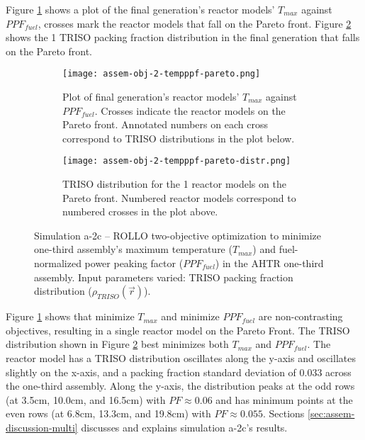 Figure \ref{fig:assem-obj-2-tempppf-pareto} shows a plot of the final generation's reactor 
models' $T_{max}$ against $PPF_{fuel}$, crosses mark the reactor models that fall on 
the Pareto front.
Figure \ref{fig:assem-obj-2-tempppf-pareto-distr} shows the 1 TRISO packing fraction 
distribution in the final generation that falls on the Pareto front. 
\begin{figure}[htbp!]
    \centering
    \begin{subfigure}{\textwidth}
        \texttt{[image: assem-obj-2-tempppf-pareto.png]}
        \caption{Plot of final generation's reactor models' $T_{max}$ against 
        $PPF_{fuel}$. 
        Crosses indicate the reactor models on the Pareto front. Annotated numbers 
        on each cross correspond to TRISO distributions in the plot below.}
        \label{fig:assem-obj-2-tempppf-pareto} 
    \end{subfigure}
    \begin{subfigure}{\textwidth}
        \centering
        \texttt{[image: assem-obj-2-tempppf-pareto-distr.png]}
        \caption{TRISO distribution for the 1 reactor models on the Pareto front.
        Numbered reactor models correspond to numbered crosses in the plot above. }
        \label{fig:assem-obj-2-tempppf-pareto-distr} 
    \end{subfigure}
    \caption{Simulation a-2c -- ROLLO two-objective optimization to minimize 
    one-third assembly's maximum temperature ($T_{max}$) and fuel-normalized power peaking factor 
    ($PPF_{fuel}$) in the \gls{AHTR} one-third assembly. 
    Input parameters varied: TRISO packing fraction distribution ($\rho_{TRISO}(\vec{r})$).}
    \label{fig:assem-obj-2-tempppf}
\end{figure}

Figure \ref{fig:assem-obj-2-tempppf-pareto} shows that minimize $T_{max}$ and minimize 
$PPF_{fuel}$ are non-contrasting objectives, resulting in a single reactor model on the 
Pareto Front. 
The TRISO distribution shown in Figure \ref{fig:assem-obj-2-tempppf-pareto-distr} best 
minimizes both $T_{max}$ and $PPF_{fuel}$. 
The reactor model has a TRISO distribution oscillates along the y-axis and oscillates 
slightly on the x-axis, and a packing fraction standard deviation of $0.033$ across 
the one-third assembly. 
Along the y-axis, the distribution peaks at the odd rows (at 3.5cm, 10.0cm, and 16.5cm) 
with $PF\approx0.06$ and has minimum points at the even rows (at 6.8cm, 13.3cm, and 
19.8cm) with $PF\approx0.055$.
Sections \ref{sec:assem-discussion-multi} discusses and explains simulation a-2c's 
results.

